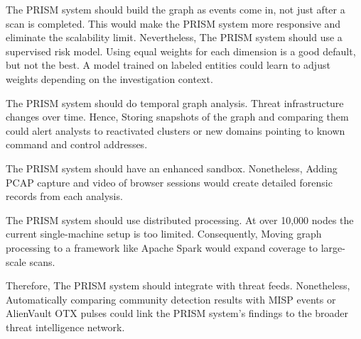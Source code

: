 \documentclass[conference]{IEEEtran}
\begin{document}
The PRISM system should build the graph as events come in, not just after a scan is completed. This would make the PRISM system more responsive and eliminate the scalability limit. Nevertheless, The PRISM system should use a supervised risk model. Using equal weights for each dimension is a good default, but not the best. A model trained on labeled entities could learn to adjust weights depending on the investigation context.

The PRISM system should do temporal graph analysis. Threat infrastructure changes over time. Hence, Storing snapshots of the graph and comparing them could alert analysts to reactivated clusters or new domains pointing to known command and control addresses.

The PRISM system should have an enhanced sandbox. Nonetheless, Adding PCAP capture and video of browser sessions would create detailed forensic records from each analysis.

The PRISM system should use distributed processing. At over 10,000 nodes the current single-machine setup is too limited. Consequently, Moving graph processing to a framework like Apache Spark would expand coverage to large-scale scans.

Therefore, The PRISM system should integrate with threat feeds. Nonetheless, Automatically comparing community detection results with MISP events or AlienVault OTX pulses could link the PRISM system's findings to the broader threat intelligence network.
\end{document}

